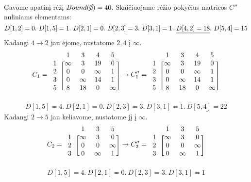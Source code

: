 \documentclass[a4paper,lithuanian]{article}
\begin{document}
Gavome apatinį rėžį $Bound(\cancel{0}) = 40$. Skaičiuojame rėžio pokyčius matricos $C''$ nuliniams elementams:
\[
D[1, 2] = 0.~
D[1, 5] = 1.~
D[2, 1] = 0.~
D[2, 3] = 3.~
D[3, 1] = 1.~
\underline{D[4, 2] = 18}.~
D[5, 4] = 15\\
\]
Kadangi $4 \rightarrow{} 2$ jau ėjome, nustatome $2, 4$ į $\infty{}$.
\[
C_1 = 
\begin{blockarray}{ccccc}
    & 1 & 3 & 4 & 5\\
\begin{block}{c[cccc]}
  1 & \infty  & 3      & 19     & 0      \\
  2 & 0       & 0      & \infty & 1      \\ 
  3 & 0       & \infty & 14     & 1      \\
  5 & 8       & 18     & 0      & \infty \\
\end{block}
\end{blockarray}
\rightarrow{}
C_1'' = 
\begin{blockarray}{ccccc}
    & 1 & 3 & 4 & 5\\
\begin{block}{c[cccc]}
  1 & \infty  & 3      & 19     & 0      \\
  2 & 0       & 0      & \infty & 1      \\ 
  3 & 0       & \infty & 14     & 1      \\
  5 & 8       & 18     & 0      & \infty \\
\end{block}
\end{blockarray}
\]
\[
D[1, 5] = 4.~
D[2, 1] = 0.~
D[2, 3] = 3.~
D[3, 1] = 1.~
\underline{D[5, 4] = 22}
\]
Kadangi $2 \rightarrow{} 5$ jau keliavome, nustatome jį į $\infty$.
\[
C_2 = 
\begin{blockarray}{cccc}
    & 1 & 3 & 5\\
\begin{block}{c[ccc]}
  1 & \infty  & 3       & 0      \\
  2 & 0       & 0       & \infty \\ 
  3 & 0       & \infty  & 1      \\
\end{block}
\end{blockarray}
\rightarrow{}
C_2'' = 
\begin{blockarray}{cccc}
    & 1 & 3 & 5\\
\begin{block}{c[ccc]}
  1 & \infty  & 3       & 0      \\
  2 & 0       & 0       & \infty \\ 
  3 & 0       & \infty  & 1      \\
\end{block}
\end{blockarray}
\]
\[
\underline{D[1, 5] = 4}.~
D[2, 1] = 0.~
D[2, 3] = 3.~
D[3, 1] = 1
\]
\end{document}

